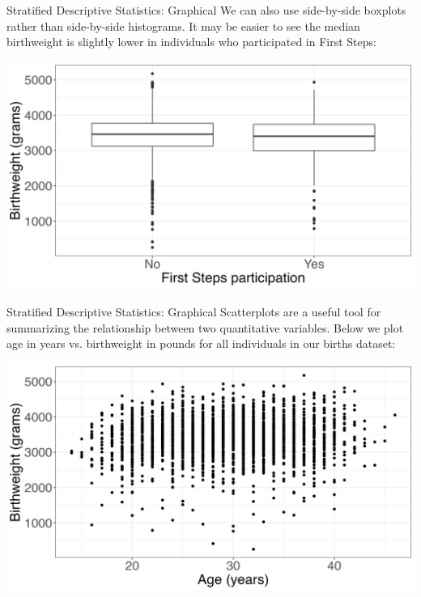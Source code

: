 \documentclass[10pt,t]{beamer}
\begin{document}
\begin{frame}{Stratified Descriptive Statistics: Graphical}
We can also use side-by-side boxplots rather than side-by-side histograms. It may be easier to see the median birthweight is slightly lower in individuals who participated in First Steps:

\vspace{0.3cm}

\centering \includegraphics[scale=0.3]{fs_box_firstep.png}
\end{frame}

\begin{frame}{Stratified Descriptive Statistics: Graphical}
Scatterplots are a useful tool for summarizing the relationship between two quantitative variables. Below we plot age in years vs. birthweight in pounds for all individuals in our births dataset:

\vspace{0.3cm}

\centering \includegraphics[scale=0.3]{fs_scatter.png}

\end{frame}
\end{document}
